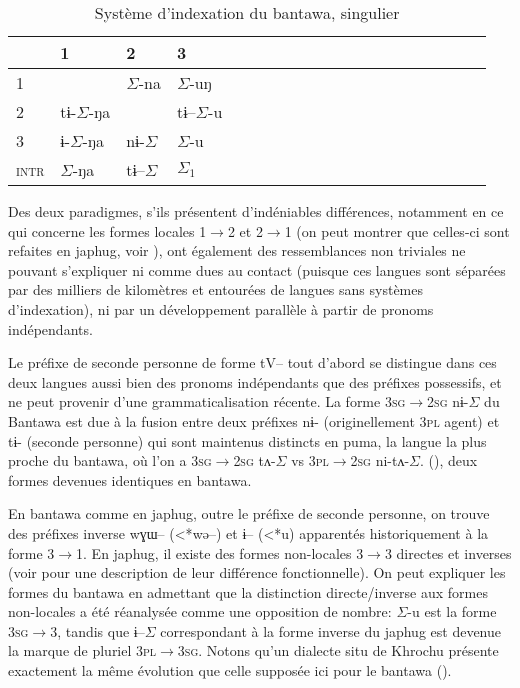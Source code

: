 \documentclass[oldfontcommands,oneside,a4paper,11pt]{article}
\newcommand{\ipa}[1]{{\phon \mbox{#1}}} %
\newcommand{\grise}[1]{\cellcolor{lightgray}\textbf{#1}}
\newcommand{\ra}{$\Sigma_1$}
\newcommand{\ro}{$\Sigma$}
\begin{document}
\begin{table}[H]
\caption{Système d'indexation du bantawa, singulier} \centering \label{tab:bantawa}
\begin{tabular}{l|lllllllllllllllllll}
\toprule
&1 & 2 &3 &\\
\midrule
1 &\grise{}& \ro{}-\ipa{na} & \ro{}-\ipa{uŋ}	 \\
2 &\ipa{tɨ-}\ro{}-\ipa{ŋa} &\grise{} &\ipa{tɨ--}\ro{}-\ipa{u}\\
3 &\ipa{ɨ-}\ro{}-\ipa{ŋa}&\ipa{nɨ-}\ro{}& \ro{}-\ipa{u}\\
\midrule
\textsc{intr} & \ro{}-\ipa{ŋa}&\ipa{tɨ--}\ro{}&\ra{} \\
\bottomrule
\end{tabular}
\end{table}

Des deux paradigmes, s'ils présentent d'indéniables différences, notamment en ce qui concerne les formes locales 1$\rightarrow$2 et 2$\rightarrow$1 (on peut montrer que celles-ci sont refaites en japhug, voir \citealt{jacques15generic}), ont également des ressemblances non triviales ne pouvant s'expliquer ni comme dues au contact (puisque ces langues sont séparées par des milliers de kilomètres et entourées de langues sans systèmes d'indexation), ni par un développement parallèle à partir de pronoms indépendants.

Le préfixe de seconde personne de forme \ipa{tV--} tout d'abord se distingue dans ces deux langues aussi bien des pronoms indépendants que des préfixes possessifs, et ne peut provenir d'une grammaticalisation récente. La forme \textsc{3sg$\rightarrow$2sg} \ipa{nɨ-}\ro{} du Bantawa est due à la fusion entre deux préfixes \ipa{nɨ-} (originellement \textsc{3pl} agent)  et \ipa{tɨ-} (seconde personne) qui sont maintenus distincts en puma, la langue la plus proche du bantawa, où l'on a \textsc{3sg$\rightarrow$2sg} \ipa{tʌ-}\ro{} vs \textsc{3pl$\rightarrow$2sg} \ipa{ni-tʌ-}\ro{}. (\citealt{bickel07puma}), deux formes devenues identiques en bantawa.

En bantawa comme en japhug, outre le préfixe de seconde personne, on trouve des préfixes  inverse \ipa{wɣɯ--} (<*\ipa{wə--}) et \ipa{ɨ--} (<*\ipa{u}) apparentés historiquement à la forme \textsc{3$\rightarrow$1}. En japhug, il existe des formes non-locales 3$\rightarrow$3 directes et inverses (voir  \citealt{jacques10inverse} pour une description de leur différence fonctionnelle). On peut expliquer les formes du bantawa en admettant que la distinction directe/inverse aux formes non-locales a été réanalysée comme une opposition de nombre:  \ro{}-\ipa{u} est la forme \textsc{3sg$\rightarrow$3}, tandis que  \ipa{ɨ--}\ro{} correspondant à la forme inverse du japhug est devenue la marque de pluriel \textsc{3pl$\rightarrow$3sg}. Notons qu'un dialecte situ de Khrochu présente exactement la même évolution que celle supposée ici pour le bantawa (\citealt{jackson15khrochu}).
\end{document}
